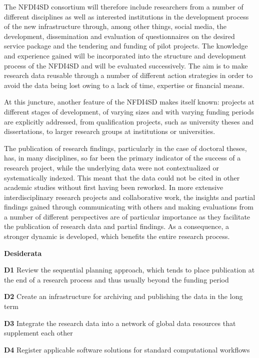 \documentclass[
  english,
  paper=a4,
  oneside,captions=tableheading
]{scrbook}
\begin{document}
The NFDI4SD consortium will therefore include researchers from a number
of different disciplines as well as interested institutions in the
development process of the new infrastructure through, among other
things, social media, the development, dissemination and evaluation of
questionnaires on the desired service package and the tendering and
funding of pilot projects. The knowledge and experience gained will be
incorporated into the structure and development process of the NFDI4SD
and will be evaluated successively. The aim is to make research data
reusable through a number of different action strategies in order to
avoid the data being lost owing to a lack of time, expertise or
financial means.

At this juncture, another feature of the NFDI4SD makes itself known:
projects at different stages of development, of varying sizes and with
varying funding periods are explicitly addressed, from qualification
projects, such as university theses and dissertations, to larger
research groups at institutions or universities.

The publication of research findings, particularly in the case of
doctoral theses, has, in many disciplines, so far been the primary
indicator of the success of a research project, while the underlying
data were not contextualized or systematically indexed. This meant that
the data could not be cited in other academic studies without first
having been reworked. In more extensive interdisciplinary research
projects and collaborative work, the insights and partial findings
gained through communicating with others and making evaluations from a
number of different perspectives are of particular importance as they
facilitate the publication of research data and partial findings. As a
consequence, a stronger dynamic is developed, which benefits the entire
research process.

\textbf{Desiderata}

\textbf{D1} Review the sequential planning approach, which tends to
place publication at the end of a research process and thus usually
beyond the funding period

\textbf{D2} Create an infrastructure for archiving and publishing the
data in the long term

\textbf{D3} Integrate the research data into a network of global data
resources that supplement each other

\textbf{D4} Register applicable software solutions for standard
computational workflows
\end{document}
